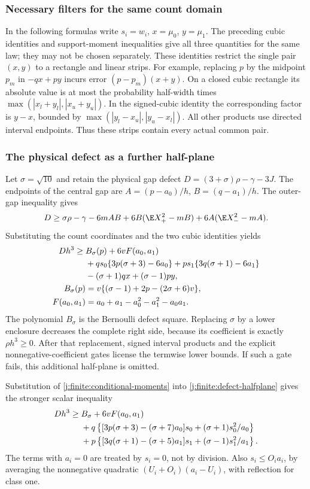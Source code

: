 \subsubsection{Necessary filters for the same count domain}\label{j:finite:filters}
In the following formulas write $s_i=w_i$, $x=\mu_0$, $y=\mu_1$.
The preceding cubic identities and support-moment inequalities give all
three quantities for the same law; they may not be chosen separately.
These identities restrict the single pair $(x,y)$ to a rectangle and
linear strips. For example, replacing $p$ by the midpoint $p_m$ in
$-qx+py$ incurs error $(p-p_m)(x+y)$. On a closed cubic rectangle
its absolute value is at most the probability half-width times
$\max(|x_l+y_l|,|x_u+y_u|)$. In the signed-cubic identity the
corresponding factor is $y-x$, bounded by
$\max(|y_l-x_u|,|y_u-x_l|)$. All other products use directed interval
endpoints. Thus these strips contain every actual common pair.

\subsubsection{The physical defect as a further half-plane}
Let $\sigma=\sqrt{10}$ and retain the physical gap defect
$D=(3+\sigma)\rho-\gamma-3J$.
The endpoints of the central gap are
$A=(p-a_0)/h$, $B=(q-a_1)/h$.
The outer-gap inequality gives
\[
 D\ge\sigma\rho-\gamma-6mAB
       +6B(\E X_+^2-mB)+6A(\E X_-^2-mA).
\]
Substituting the count coordinates and the two cubic identities yields
\begin{align}
 Dh^3\ge{}&B_\sigma(p)+6vF(a_0,a_1)\notag\\
 &+qs_0\{3p(\sigma+3)-6a_0\}
  +ps_1\{3q(\sigma+1)-6a_1\}\notag\\
 &-(\sigma+1)qx+(\sigma-1)py,\label{j:finite:defect-halfplane}\\
 B_\sigma(p)&=v\{(\sigma-1)+2p-(2\sigma+6)v\},\notag\\
 F(a_0,a_1)&=a_0+a_1-a_0^2-a_1^2-a_0a_1.\notag
\end{align}
The polynomial $B_\sigma$ is the Bernoulli defect square.
Replacing $\sigma$ by a lower enclosure decreases the complete right
side, because its coefficient is exactly $\rho h^3\ge0$.
After that replacement, signed interval products and the explicit
nonnegative-coefficient gates license the termwise lower bounds.
If such a gate fails, this additional half-plane is omitted.

Substitution of \eqref{j:finite:conditional-moments} into
\eqref{j:finite:defect-halfplane} gives the stronger scalar inequality
\begin{align}
 Dh^3\ge{}&B_\sigma+6vF(a_0,a_1)\notag\\
 &+q\left\{[3p(\sigma+3)-(\sigma+7)a_0]s_0
                         +(\sigma+1)s_0^2/a_0\right\}\notag\\
 &+p\left\{[3q(\sigma+1)-(\sigma+5)a_1]s_1
                         +(\sigma-1)s_1^2/a_1\right\}.
 \label{j:finite:defect-sharp}
\end{align}
The terms with $a_i=0$ are treated by $s_i=0$, not by division.
Also $s_i\le O_i a_i$, by averaging the nonnegative quadratic
$(U_i+O_i)(a_i-U_i)$, with reflection for class one.

